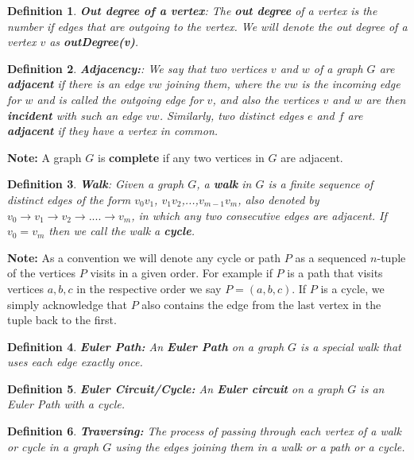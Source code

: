 \documentclass[17pt]{article}
\newtheorem{definition}{Definition}
\begin{document}
\begin{definition}\textbf{Out degree of a vertex}: The \textbf{out degree} of a vertex is the number if edges that are outgoing to the vertex. We will denote the out degree of a vertex $v$ as \textbf{outDegree(v)}.
\end{definition}

\begin{definition}\textbf{Adjacency:}: We say that two vertices $v$ and $w$ of a graph $G$ are \textbf{adjacent} if there is an edge $vw$ joining
them, where the $vw$ is the incoming edge for $w$ and is called the outgoing edge for $v$, and also the vertices $v$ and $w$ are then \textbf{incident} with such an edge $vw$. Similarly, two
distinct edges $e$ and $f$ are \textbf{adjacent} if they have a vertex in common.
\end{definition}
\textbf{Note:} A graph $G$ is \textbf{complete} if any two vertices in $G$ are adjacent.

\begin{definition}\textbf{Walk}: Given a graph $G$, a \textbf{walk} in $G$ is a finite sequence of distinct edges of the form $v_0v_1$, $v_1v_2$,...,$v_{m-1}v_m$, also denoted by $v_0 \rightarrow v_1 \rightarrow v_2 \rightarrow ....\rightarrow v_m$, in which any two consecutive edges are adjacent.  If $v_0 = v_m$ then we call the walk a \textbf{cycle}.
\end{definition}
 \textbf{Note:} As a convention we will denote any cycle or path $P$ as a sequenced $n$-tuple of the vertices $P$ visits in a given order. For example if $P$ is a path that visits vertices $a,b,c$ in the respective order we say $P = (a,b,c)$. If $P$ is a cycle, we simply acknowledge that $P$ also contains the edge from the last vertex in the tuple back to the first.\newline

\begin{definition}\textbf{Euler Path: }An \textbf{Euler Path} on a graph $G$ is a special walk that uses each edge exactly once.
\end{definition}

\begin{definition}\textbf{Euler Circuit/Cycle: }An \textbf{Euler circuit} on a graph $G$ is an Euler Path with a cycle.
\end{definition}

\begin{definition} \textbf{Traversing: }The process of passing through each vertex of a  walk or cycle in a graph $G$ using the edges joining them in a walk or a path or a cycle.
\end{definition}
\end{document}
